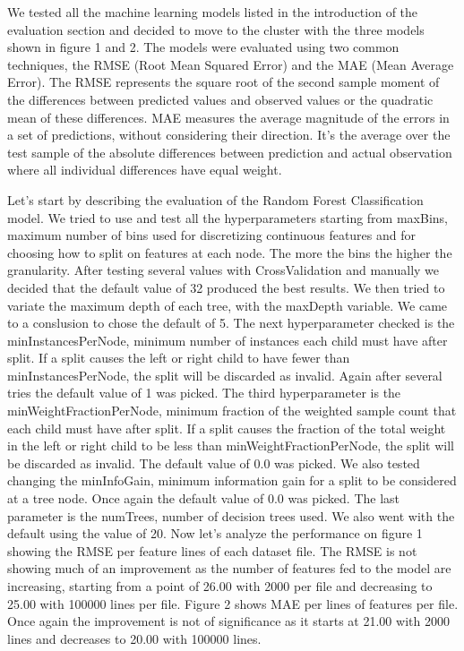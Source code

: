 	We tested all the machine learning models listed in the introduction of the evaluation section and decided to move to the cluster with the three models shown in figure 1 and 2. The models were evaluated using two common techniques, the RMSE (Root Mean Squared Error) and the MAE (Mean Average Error). The RMSE represents the square root of the second sample moment of the differences between predicted values and observed values or the quadratic mean of these differences. MAE measures the average magnitude of the errors in a set of predictions, without considering their direction. It's the average over the test sample of the absolute differences between prediction and actual observation where all individual differences have equal weight.
\par	Let’s start by describing the evaluation of the Random Forest Classification model. We tried to use and test all the hyperparameters starting from maxBins, maximum number of bins used for discretizing continuous features and for choosing how to split on features at each node. The more the bins the higher the granularity. After testing several values with CrossValidation and manually we decided that the default value of 32 produced the best results. We then tried to variate the maximum depth of each tree, with the maxDepth variable. We came to a conslusion to chose the default of 5. The next hyperparameter checked is the minInstancesPerNode, minimum number of instances each child must have after split. If a split causes the left or right child to have fewer than minInstancesPerNode, the split will be discarded as invalid. Again after several tries the default value of 1 was picked. The third hyperparameter is the minWeightFractionPerNode, minimum fraction of the weighted sample count that each child must have after split. If a split causes the fraction of the total weight in the left or right child to be less than minWeightFractionPerNode, the split will be discarded as invalid. The default value of 0.0 was picked. We also tested changing the minInfoGain, minimum information gain for a split to be considered at a tree node. Once again the default value of 0.0 was picked. The last parameter is the numTrees, number of decision trees used. We also went with the default using the value of 20. Now let’s analyze the performance on figure 1 showing the RMSE per feature lines of each dataset file. The RMSE is not showing much of an improvement as the number of features fed to the model are increasing, starting from a point of 26.00 with 2000 per file and decreasing to 25.00 with 100000 lines per file. Figure 2 shows MAE per lines of features per file. Once again the improvement is not of significance as it starts at 21.00 with 2000 lines and decreases to 20.00 with 100000 lines.
